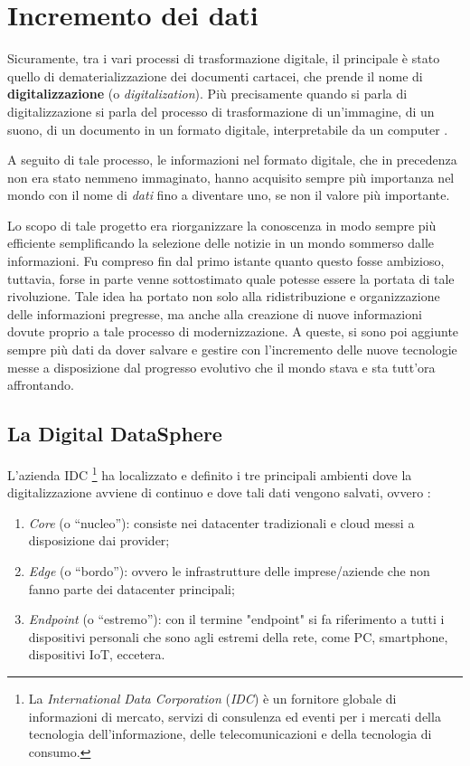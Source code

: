 \section{Incremento dei dati}

Sicuramente, tra i vari processi di trasformazione digitale, il principale è stato quello di dematerializzazione dei documenti cartacei, che prende il nome di \textbf{digitalizzazione} (o \textit{digitalization}). Più precisamente quando si parla di digitalizzazione si parla del processo di trasformazione di un'immagine, di un suono, di un documento in un formato digitale, interpretabile da un computer \cite{wikipedia_digitalization_definition}.

A seguito di tale processo, le informazioni nel formato digitale, che in precedenza non era stato nemmeno immaginato, hanno acquisito sempre più importanza nel mondo con il nome di \textit{dati} fino a diventare uno, se non il valore più importante.

Lo scopo di tale progetto era riorganizzare la conoscenza in modo sempre più efficiente semplificando la selezione delle notizie in un mondo sommerso dalle informazioni. Fu compreso fin dal primo istante quanto questo fosse ambizioso, tuttavia, forse in parte venne sottostimato quale potesse essere la portata di tale rivoluzione. Tale idea ha portato non solo alla ridistribuzione e organizzazione delle informazioni pregresse, ma anche alla creazione di nuove informazioni dovute proprio a tale processo di modernizzazione. A queste, si sono poi aggiunte sempre più dati da dover salvare e gestire con l'incremento delle nuove tecnologie messe a disposizione dal progresso evolutivo che il mondo stava e sta tutt'ora affrontando. 

\subsection{La Digital DataSphere}

L'azienda IDC \footnote{La \textit{International Data Corporation} (\textit{IDC}) è un fornitore globale di informazioni di mercato, servizi di consulenza ed eventi per i mercati della tecnologia dell'informazione, delle telecomunicazioni e della tecnologia di consumo.} ha localizzato e definito i tre principali ambienti dove la digitalizzazione avviene di continuo e dove tali dati vengono salvati, ovvero \cite{idc_digital_datasphere}:

\begin{enumerate}
    \item \textit{Core} (o “nucleo”): consiste nei datacenter tradizionali e cloud messi a disposizione dai provider;
    \item \textit{Edge} (o “bordo”): ovvero le infrastrutture delle imprese/aziende che non fanno parte dei datacenter principali; 
    \item \textit{Endpoint} (o “estremo”): con il termine "endpoint" si fa riferimento a tutti i dispositivi personali che sono agli estremi della rete, come PC, smartphone, dispositivi IoT, eccetera. 
\end{enumerate}

